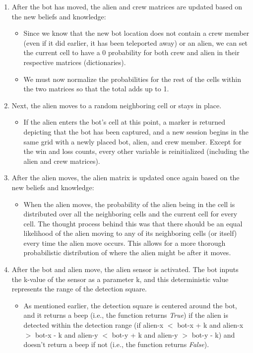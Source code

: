 \documentclass[11pt]{article}
\begin{document}
\begin{enumerate}
\begin{itemize}
    \end{itemize}
    \item After the bot has moved, the alien and crew matrices are updated based on the new beliefs and knowledge:
    \begin{itemize}
        \item Since we know that the new bot location does not contain a crew member (even if it did earlier, it has been teleported away) or an alien, we can set the current cell to have a 0 probability for both crew and alien in their respective matrices (dictionaries).
        \item We must now normalize the probabilities for the rest of the cells within the two matrices so that the total adds up to 1.
    \end{itemize}
    \item Next, the alien moves to a random neighboring cell or stays in place.
    \begin{itemize}
        \item If the alien enters the bot's cell at this point, a marker is returned depicting that the bot has been captured, and a new session begins in the same grid with a newly placed bot, alien, and crew member. Except for the win and loss counts, every other variable is reinitialized (including the alien and crew matrices).
    \end{itemize}
    \item After the alien moves, the alien matrix is updated once again based on the new beliefs and knowledge:
    \begin{itemize}
        \item When the alien moves, the probability of the alien being in the cell is distributed over all the neighboring cells and the current cell for every cell. The thought process behind this was that there should be an equal likelihood of the alien moving to any of its neighboring cells (or itself) every time the alien move occurs. This allows for a more thorough probabilistic distribution of where the alien might be after it moves.
    \end{itemize}
    \item After the bot and alien move, the alien sensor is activated. The bot inputs the k-value of the sensor as a parameter k, and this deterministic value represents the range of the detection square. 
    \begin{itemize}
        \item As mentioned earlier, the detection square is centered around the bot, and it returns a beep (i.e., the function returns \emph{True}) if the alien is detected within the detection range (if alien-x $<$ bot-x + k and alien-x $>$ bot-x - k and alien-y $<$ bot-y + k and alien-y $>$ bot-y - k) and doesn't return a beep if not (i.e., the function returns \emph{False}). 

\end{itemize}
\end{enumerate}
\end{document}
